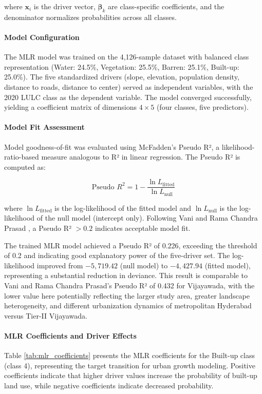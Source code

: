 \documentclass[12pt,a4paper]{article}
\begin{document}
where $\mathbf{x}_i$ is the driver vector, $\boldsymbol{\beta}_k$ 
are class-specific coefficients, and the denominator normalizes 
probabilities across all classes.
\paragraph{Model Configuration}
The MLR model was trained on the 4,126-sample dataset with balanced class representation (Water: 24.5\%, Vegetation: 25.5\%, Barren: 25.1\%, Built-up: 25.0\%). The five standardized drivers (slope, elevation, population density, distance to roads, distance to center) served as independent variables, with the 2020 LULC class as the dependent variable. The model converged successfully, yielding a coefficient matrix of dimensions $4 \times 5$ (four classes, five predictors).

\paragraph{Model Fit Assessment}
Model goodness-of-fit was evaluated using McFadden's Pseudo R², a likelihood-ratio-based measure analogous to R² in linear regression. The Pseudo R² is computed as:

\begin{equation}
\text{Pseudo } R^2 = 1 - \frac{\ln L_{\text{fitted}}}{\ln L_{\text{null}}}
\label{eq:pseudo_r2}
\end{equation}

where $\ln L_{\text{fitted}}$ is the log-likelihood of the fitted model and $\ln L_{\text{null}}$ is the log-likelihood of the null model (intercept only). Following Vani and Rama Chandra Prasad \cite{vani2022}, a Pseudo R² $> 0.2$ indicates acceptable model fit.

The trained MLR model achieved a Pseudo R² of 0.226, exceeding the threshold of 0.2 and indicating good explanatory power of the five-driver set. The log-likelihood improved from $-5,719.42$ (null model) to $-4,427.94$ (fitted model), representing a substantial reduction in deviance. This result is comparable to Vani and Rama Chandra Prasad's \cite{vani2022} Pseudo R² of 0.432 for Vijayawada, with the lower value here potentially reflecting the larger study area, greater landscape heterogeneity, and different urbanization dynamics of metropolitan Hyderabad versus Tier-II Vijayawada.

\paragraph{MLR Coefficients and Driver Effects}
Table \ref{tab:mlr_coefficients} presents the MLR coefficients for the Built-up class (class 4), representing the target transition for urban growth modeling. Positive coefficients indicate that higher driver values increase the probability of built-up land use, while negative coefficients indicate decreased probability.
\end{document}
